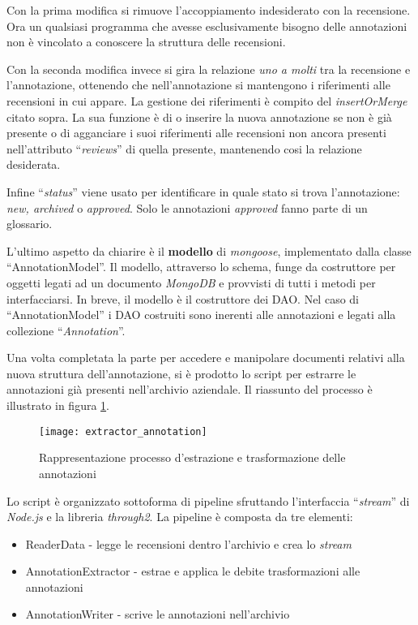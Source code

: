 Con la prima modifica si rimuove l'accoppiamento indesiderato con la recensione.
Ora un qualsiasi programma che avesse esclusivamente bisogno delle annotazioni
non è vincolato a conoscere la struttura delle recensioni.

Con la seconda modifica invece si gira la relazione \textit{uno a molti} tra
la recensione e l'annotazione, ottenendo che nell'annotazione si mantengono i
riferimenti alle recensioni in cui appare. La gestione dei riferimenti è
compito del \textit{insertOrMerge} citato sopra. La sua funzione è di o inserire
la nuova annotazione se non è già presente o di agganciare i suoi riferimenti
alle recensioni non ancora presenti nell'attributo ``\textit{reviews}'' di
quella presente, mantenendo cosi la relazione desiderata.

Infine ``\textit{status}'' viene usato per identificare in quale stato si trova
l'annotazione: \textit{new, archived} o \textit{approved}. Solo le annotazioni
\textit{approved} fanno parte di un glossario.

L'ultimo aspetto da chiarire è il \textbf{modello} di \textit{mongoose},
implementato dalla classe ``AnnotationModel''. Il modello, attraverso lo schema,
funge da costruttore per oggetti legati ad un documento \textit{MongoDB} e
provvisti di tutti i metodi per interfacciarsi. In breve, il modello è il
costruttore dei \gls{DAO}. Nel caso di ``AnnotationModel'' i \gls{DAO}
costruiti sono inerenti alle annotazioni e legati alla collezione
``\textit{Annotation}''.

Una volta completata la parte per accedere e manipolare documenti relativi
alla nuova struttura dell'annotazione, si è prodotto lo \gls{script} per
estrarre le annotazioni già presenti nell'archivio aziendale. Il riassunto del
processo è illustrato in figura \ref{fig:extractor_annotation}.

\begin{figure}[H]
\begin{center}
\texttt{[image: extractor\_annotation]}
\caption{
Rappresentazione processo d'estrazione e trasformazione delle annotazioni
}
\label{fig:extractor_annotation}
\end{center}
\end{figure}

Lo script è organizzato sottoforma di \gls{pipeline} sfruttando l'interfaccia
``\textit{stream}'' di \textit{Node.js} e la libreria \textit{through2}. La
\gls{pipeline} è composta da tre elementi:
\begin{itemize}
\item ReaderData - legge le recensioni dentro l'archivio e crea lo
\textit{stream}
\item AnnotationExtractor - estrae e applica le debite trasformazioni alle
annotazioni
\item AnnotationWriter - scrive le annotazioni nell'archivio
\end{itemize}

